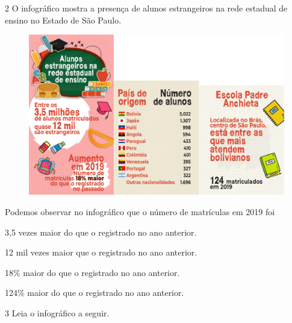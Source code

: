 \pagebreak
\num{2} O infográfico mostra a presença de alunos estrangeiros na rede
estadual de ensino no Estado de São Paulo.

\begin{figure}[htpb!]
\centering
\includegraphics[width=\textwidth]{media/image33.jpeg}
\end{figure}


Podemos observar no infográfico que o número de matrículas em 2019 foi

\begin{escolha}
\item 3,5 vezes maior do que o registrado no ano anterior.

\item 12 mil vezes maior que o registrado no ano anterior.

\item 18\% maior do que o registrado no ano anterior.

\item 124\% maior do que o registrado no ano anterior.

\end{escolha}

\pagebreak
\num{3} Leia o infográfico a seguir.

